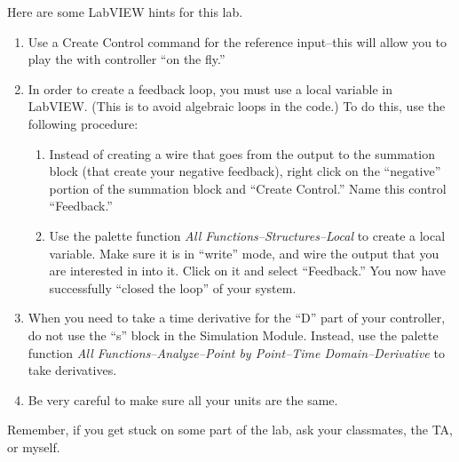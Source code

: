 Here are some LabVIEW hints for this lab.

\begin{enumerate}
\item Use a Create Control command for the reference input--this will allow you
  to play the with controller ``on the fly.''
\item In order to create a feedback loop, you must use a local variable in
  LabVIEW.  (This is to avoid algebraic loops in the code.)  To do this, use the
  following procedure:
  \begin{enumerate}
  \item Instead of creating a wire that goes from the output to the summation
    block (that create your negative feedback), right click on the ``negative''
    portion of the summation block and ``Create Control.''  Name this control
    ``Feedback.''  
  \item Use the palette function \emph{All Functions--Structures--Local} to create a
    local variable.  Make sure it is in ``write'' mode, and wire the output that
    you are interested in into it.  Click on it and select ``Feedback.''  You
    now have successfully ``closed the loop'' of your system.  
  \end{enumerate}
\item When you need to take a time derivative for the ``D'' part of your
  controller, do not use the ``s'' block in the Simulation Module.  Instead, use
  the palette function \emph{All Functions--Analyze--Point by Point--Time
    Domain--Derivative} to take derivatives.
\item Be very careful to make sure all your units are the same.
\end{enumerate}




\vspace{0.2in}
         

\noindent Remember, if you get stuck on some part of the lab, ask your
classmates, the TA, or myself.


